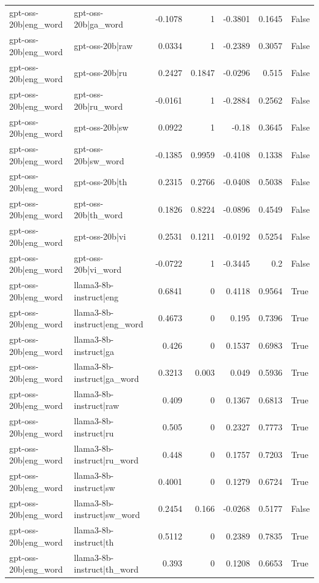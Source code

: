 \begin{table}
\begin{tabular}{l l r r r r l}
gpt-oss-20b|eng_word & gpt-oss-20b|ga_word & -0.1078 & 1 & -0.3801 & 0.1645 & False \\
gpt-oss-20b|eng_word & gpt-oss-20b|raw & 0.0334 & 1 & -0.2389 & 0.3057 & False \\
gpt-oss-20b|eng_word & gpt-oss-20b|ru & 0.2427 & 0.1847 & -0.0296 & 0.515 & False \\
gpt-oss-20b|eng_word & gpt-oss-20b|ru_word & -0.0161 & 1 & -0.2884 & 0.2562 & False \\
gpt-oss-20b|eng_word & gpt-oss-20b|sw & 0.0922 & 1 & -0.18 & 0.3645 & False \\
gpt-oss-20b|eng_word & gpt-oss-20b|sw_word & -0.1385 & 0.9959 & -0.4108 & 0.1338 & False \\
gpt-oss-20b|eng_word & gpt-oss-20b|th & 0.2315 & 0.2766 & -0.0408 & 0.5038 & False \\
gpt-oss-20b|eng_word & gpt-oss-20b|th_word & 0.1826 & 0.8224 & -0.0896 & 0.4549 & False \\
gpt-oss-20b|eng_word & gpt-oss-20b|vi & 0.2531 & 0.1211 & -0.0192 & 0.5254 & False \\
gpt-oss-20b|eng_word & gpt-oss-20b|vi_word & -0.0722 & 1 & -0.3445 & 0.2 & False \\
gpt-oss-20b|eng_word & llama3-8b-instruct|eng & 0.6841 & 0 & 0.4118 & 0.9564 & True \\
gpt-oss-20b|eng_word & llama3-8b-instruct|eng_word & 0.4673 & 0 & 0.195 & 0.7396 & True \\
gpt-oss-20b|eng_word & llama3-8b-instruct|ga & 0.426 & 0 & 0.1537 & 0.6983 & True \\
gpt-oss-20b|eng_word & llama3-8b-instruct|ga_word & 0.3213 & 0.003 & 0.049 & 0.5936 & True \\
gpt-oss-20b|eng_word & llama3-8b-instruct|raw & 0.409 & 0 & 0.1367 & 0.6813 & True \\
gpt-oss-20b|eng_word & llama3-8b-instruct|ru & 0.505 & 0 & 0.2327 & 0.7773 & True \\
gpt-oss-20b|eng_word & llama3-8b-instruct|ru_word & 0.448 & 0 & 0.1757 & 0.7203 & True \\
gpt-oss-20b|eng_word & llama3-8b-instruct|sw & 0.4001 & 0 & 0.1279 & 0.6724 & True \\
gpt-oss-20b|eng_word & llama3-8b-instruct|sw_word & 0.2454 & 0.166 & -0.0268 & 0.5177 & False \\
gpt-oss-20b|eng_word & llama3-8b-instruct|th & 0.5112 & 0 & 0.2389 & 0.7835 & True \\
gpt-oss-20b|eng_word & llama3-8b-instruct|th_word & 0.393 & 0 & 0.1208 & 0.6653 & True \\

\end{tabular}
\end{table}
